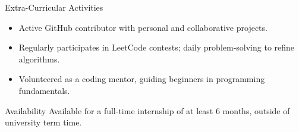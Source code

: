 \documentclass{resume} %
\begin{document}

\begin{rSection}{Extra-Curricular Activities} 
\begin{itemize}[noitemsep, topsep=0pt, leftmargin=*]
    \item Active GitHub contributor with personal and collaborative projects.
    \item Regularly participates in LeetCode contests; daily problem-solving to refine algorithms.
    \item Volunteered as a coding mentor, guiding beginners in programming fundamentals.
\end{itemize}
\end{rSection}




\begin{rSection}{Availability}
Available for a full-time internship of at least 6 months, outside of university term time.
\end{rSection}
\end{document}
